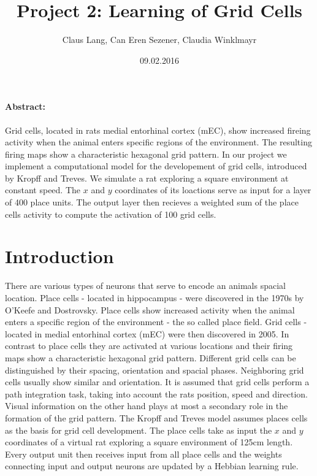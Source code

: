 \documentclass[a4paper, 12pt]{article}
\title{Project 2: Learning of Grid Cells}
\author{Claus Lang, Can Eren Sezener, Claudia Winklmayr}
\date{09.02.2016}
\begin{document}
\maketitle

\paragraph{Abstract:}
Grid cells, located in rats medial entorhinal cortex (mEC), show increased fireing activity when the animal enters specific regions of the environment. The resulting firing maps show a characteristic hexagonal grid pattern. In our project we implement a computational model for the developement of grid cells, introduced by Kropff and Treves. We simulate a rat exploring a square environment at constant speed. The $x$ and $y$ coordinates of its loactions serve as input for a layer of 400 place units. The output layer then recieves a weighted sum of the place cells activity to compute the activation of 100 grid cells.

\section{Introduction}
There are various types of neurons that serve to encode an animals spacial location. Place cells - located in hippocampus - were discovered in the 1970s by O'Keefe and Dostrovsky. Place cells show increased activity when the animal enters a specific region of the environment - the so called place field.\newline
Grid cells - located in medial entorhinal cortex (mEC) were then discovered in 2005. In contrast to place cells they are activated at various locations and their firing maps show a characteristic hexagonal grid pattern. Different grid cells can be distinguished by their spacing, orientation and spacial phases. Neighboring grid cells usually show similar and orientation. \newline
It is assumed that grid cells perform a path integration task, taking into account the rats position, speed and direction. Visual information on the other hand plays at most a secondary role in the formation of the grid pattern. \newline
The Kropff and Treves model assumes places cells as the basis for grid cell development. The place cells take as input the $x$ and $y$ coordinates of a virtual rat exploring a square environment of 125cm length. Every output unit then receives input from all place cells and the weights connecting input and output neurons are updated by a Hebbian learning rule. 
%
%
%
\end{document}
